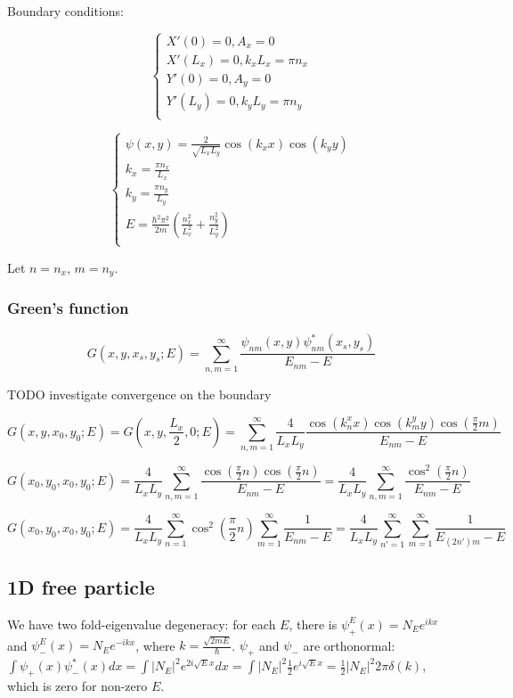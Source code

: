 \documentclass[12pt, a4paper]{article}
\begin{document}
Boundary conditions:

$$\begin{cases}
X'(0) = 0, A_x = 0 \\
X'(L_x) = 0, k_x L_x = \pi n_x \\
Y'(0) = 0, A_y = 0 \\
Y'(L_y) = 0, k_y L_y = \pi n_y \\
\end{cases}$$

$$\begin{cases}
\psi(x, y) = \frac{2}{\sqrt{L_x L_y}} \cos(k_x x) \cos(k_y y) \\
k_x = \frac{\pi n_x}{L_x} \\
k_y = \frac{\pi n_y}{L_y} \\
E = \frac{\hbar^2 \pi^2}{2 m} \left(\frac{n_x^2}{L_x^2} + \frac{n_y^2}{L_y^2} \right) \\
\end{cases}$$

Let $n = n_x$, $m = n_y$.

\subsubsection{Green's function}

$$G(x, y, x_s, y_s; E) = \sum\limits_{n, m = 1}^\infty \frac{\psi_{nm}(x, y) \psi^*_{nm}(x_s, y_s)}{E_{nm} - E}$$

TODO investigate convergence on the boundary

$$G(x, y, x_0, y_0; E) = G(x, y, \frac{L_x}{2}, 0; E) = \sum\limits_{n, m = 1}^\infty \frac{4}{L_x L_y} \frac{\cos(k^x_n x) \cos(k^y_m y) \cos(\frac{\pi}{2}m)}{E_{nm} - E}$$

$$G(x_0, y_0, x_0, y_0; E) = \frac{4}{L_x L_y} \sum\limits_{n, m = 1}^\infty \frac{\cos(\frac{\pi}{2}n) \cos(\frac{\pi}{2}n)}{E_{nm} - E} = \frac{4}{L_x L_y} \sum\limits_{n, m = 1}^\infty \frac{\cos^2(\frac{\pi}{2}n)}{E_{nm} - E}$$

$$G(x_0, y_0, x_0, y_0; E) = \frac{4}{L_x L_y} \sum\limits_{n = 1}^\infty \cos^2(\frac{\pi}{2}n) \sum\limits_{m = 1}^\infty \frac{1}{E_{nm} - E} = \frac{4}{L_x L_y} \sum\limits_{n' = 1}^\infty \sum\limits_{m = 1}^\infty \frac{1}{E_{(2n')m} - E}$$

\subsection{1D free particle}
We have two fold-eigenvalue degeneracy: for each $E$, there is $\psi^E_+(x) = N_E e^{i k x}$ and $\psi^E_-(x) = N_E e^{-i k x}$, where $k = \frac{\sqrt{2 m E}}{\hbar}$. $\psi_+$ and $\psi_-$ are orthonormal: $\int \psi_+(x) \psi^*_-(x) dx = \int |N_E|^2 e^{2 i \sqrt{E} x} dx = \int |N_E|^2 \frac{1}{2} e^{i \sqrt{E} x} = \frac{1}{2} |N_E|^2 2 \pi \delta(k)$, which is zero for non-zero $E$.
\end{document}
